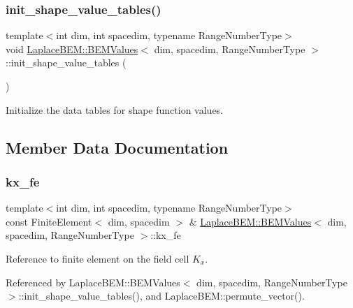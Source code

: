 \subsubsection{\texorpdfstring{init\+\_\+shape\+\_\+value\+\_\+tables()}{init\_shape\_value\_tables()}\hspace{0.1cm}{\footnotesize\ttfamily [2/2]}}
{\footnotesize\ttfamily template$<$int dim, int spacedim, typename Range\+Number\+Type$>$ \\
void \hyperlink{classLaplaceBEM_1_1BEMValues}{Laplace\+B\+E\+M\+::\+B\+E\+M\+Values}$<$ dim, spacedim, Range\+Number\+Type $>$\+::init\+\_\+shape\+\_\+value\+\_\+tables (\begin{DoxyParamCaption}{ }\end{DoxyParamCaption})\hspace{0.3cm}{\ttfamily [protected]}}

Initialize the data tables for shape function values. 

\subsection{Member Data Documentation}
\mbox{\label{classLaplaceBEM_1_1BEMValues_a9107fb87f456e86caa04ba3348982189}} 
\subsubsection{\texorpdfstring{kx\+\_\+fe}{kx\_fe}}
{\footnotesize\ttfamily template$<$int dim, int spacedim, typename Range\+Number\+Type$>$ \\
const Finite\+Element$<$ dim, spacedim $>$ \& \hyperlink{classLaplaceBEM_1_1BEMValues}{Laplace\+B\+E\+M\+::\+B\+E\+M\+Values}$<$ dim, spacedim, Range\+Number\+Type $>$\+::kx\+\_\+fe}

Reference to finite element on the field cell $K_x$. 

Referenced by Laplace\+B\+E\+M\+::\+B\+E\+M\+Values$<$ dim, spacedim, Range\+Number\+Type $>$\+::init\+\_\+shape\+\_\+value\+\_\+tables(), and Laplace\+B\+E\+M\+::permute\+\_\+vector().

\mbox{\label{classLaplaceBEM_1_1BEMValues_af4356394bc832b8a4ff732885916384b}} 
